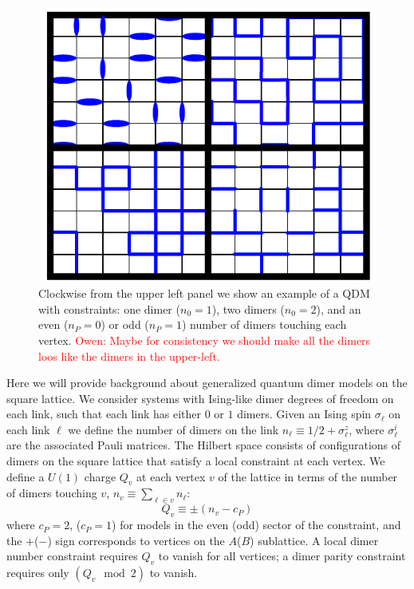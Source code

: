 \documentclass[twocolumn,prb,aps,floatfix,superscriptaddress]{revtex4-1}
\newcommand{\note}[1]{\textcolor{red}{#1}}
\begin{document}
\begin{figure}[htpb]
    \centering
    \includegraphics[width=0.8\linewidth]{example_local_constraints.pdf}
    \caption{Clockwise from the upper left panel we show an example of a QDM with constraints: one
    dimer ($n_0 = 1$), two dimers ($n_0 = 2$), and an even ($n_P = 0$) or odd ($n_P = 1$) number of dimers touching each vertex. \note{Owen: Maybe for consistency we should make all the dimers loos like the dimers in the upper-left.}}
    \label{fig:example_local_constraints}
\end{figure}
Here we will provide background about generalized quantum dimer models on the square lattice. We consider systems with Ising-like dimer degrees of freedom on each link, such that each link has either $0$ or $1$ dimers. Given an Ising spin $\sigma_\ell$ on each link $\ell$ we define the number of dimers on the link $n_\ell \equiv 1/2+\sigma_\ell^z$, where $\sigma_\ell^i$ are the associated Pauli matrices. The Hilbert space consists of configurations of dimers on the square lattice that satisfy a local constraint at each vertex. We define a $U(1)$ charge $Q_v$ at each vertex $v$ of the lattice in terms of the number of dimers touching $v$, $n_v\equiv \sum_{\ell \in v}n_\ell$:
\begin{equation}
Q_v \equiv \pm \left( n_v - c_P \right)
\end{equation}
where $c_P = 2$, ($c_P=1$) for models in the even (odd) sector of the constraint, and the $+$($-$) sign corresponds to vertices on the $A$($B$) sublattice. A local dimer number constraint requires $Q_v$ to vanish for all vertices; a dimer parity constraint requires only $(Q_v\mod 2)$ to vanish.
 
\end{document}
